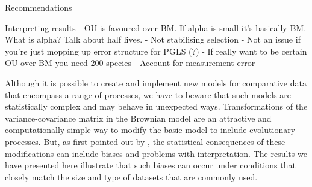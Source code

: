 \documentclass[a4paper,12pt]{article}
\begin{document}
Recommendations

Interpreting results
 - OU is favoured over BM. If alpha is small it's basically BM. What
is alpha? Talk about half lives.
 - Not stabilising selection
 - Not an issue if you're just mopping up error structure for PGLS (?)
 - If really want to be certain OU over BM you need 200 species
 - Account for measurement error



Although it is possible to create and implement new models for comparative data that encompass a range of processes, we have to beware that such models are statistically complex and may behave in unexpected ways. Transformations of the variance-covariance matrix in the Brownian model are an attractive and computationally simple way to modify the basic model to include evolutionary processes. But, as first pointed out by \citet{grafen1989phylogenetic}, the statistical consequences of these modifications can include biases and problems with interpretation. The results we have presented here illustrate that such biases can occur under conditions that closely match the size and type of datasets that are commonly used. 
\end{document}
